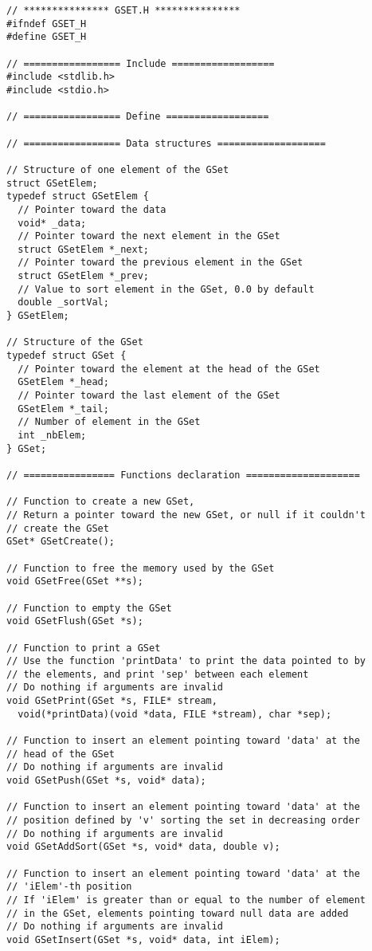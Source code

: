 \documentclass[12pt, a4paper]{article}
\begin{document}
\begin{scriptsize}
\begin{ttfamily}
\begin{lstlisting}
// *************** GSET.H ***************
#ifndef GSET_H
#define GSET_H

// ================= Include ==================
#include <stdlib.h>
#include <stdio.h>

// ================= Define ==================

// ================= Data structures ===================

// Structure of one element of the GSet
struct GSetElem;
typedef struct GSetElem {
  // Pointer toward the data
  void* _data;
  // Pointer toward the next element in the GSet
  struct GSetElem *_next;
  // Pointer toward the previous element in the GSet
  struct GSetElem *_prev;
  // Value to sort element in the GSet, 0.0 by default
  double _sortVal;
} GSetElem;

// Structure of the GSet
typedef struct GSet {
  // Pointer toward the element at the head of the GSet
  GSetElem *_head;
  // Pointer toward the last element of the GSet
  GSetElem *_tail;
  // Number of element in the GSet
  int _nbElem;
} GSet;

// ================ Functions declaration ====================

// Function to create a new GSet,
// Return a pointer toward the new GSet, or null if it couldn't
// create the GSet
GSet* GSetCreate();

// Function to free the memory used by the GSet
void GSetFree(GSet **s);

// Function to empty the GSet
void GSetFlush(GSet *s);

// Function to print a GSet
// Use the function 'printData' to print the data pointed to by 
// the elements, and print 'sep' between each element
// Do nothing if arguments are invalid
void GSetPrint(GSet *s, FILE* stream, 
  void(*printData)(void *data, FILE *stream), char *sep);

// Function to insert an element pointing toward 'data' at the 
// head of the GSet
// Do nothing if arguments are invalid
void GSetPush(GSet *s, void* data);

// Function to insert an element pointing toward 'data' at the 
// position defined by 'v' sorting the set in decreasing order
// Do nothing if arguments are invalid
void GSetAddSort(GSet *s, void* data, double v);

// Function to insert an element pointing toward 'data' at the 
// 'iElem'-th position 
// If 'iElem' is greater than or equal to the number of element
// in the GSet, elements pointing toward null data are added
// Do nothing if arguments are invalid
void GSetInsert(GSet *s, void* data, int iElem);


\end{lstlisting}
\end{ttfamily}
\end{scriptsize}
\end{document}
